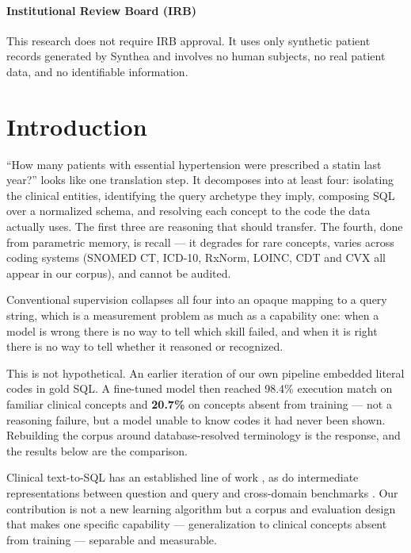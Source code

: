 \documentclass[pmlr,twocolumn,10pt]{jmlr} %
\begin{document}
\paragraph*{Institutional Review Board (IRB)}
This research does not require IRB approval. It uses only synthetic patient
records generated by Synthea and involves no human subjects, no real patient
data, and no identifiable information.
\fi

\section{Introduction}
\label{sec:intro}

``How many patients with essential hypertension were prescribed a statin last
year?'' looks like one translation step. It decomposes into at least four:
isolating the clinical entities, identifying the query archetype they imply,
composing SQL over a normalized schema, and resolving each concept to the code
the data actually uses. The first three are reasoning that should transfer. The
fourth, done from parametric memory, is recall --- it degrades for rare concepts,
varies across coding systems (SNOMED CT, ICD-10, RxNorm, LOINC, CDT and CVX all
appear in our corpus), and cannot be audited.

Conventional supervision collapses all four into an opaque mapping to a query
string, which is a measurement problem as much as a capability one: when a model
is wrong there is no way to tell which skill failed, and when it is right there
is no way to tell whether it reasoned or recognized.

This is not hypothetical. An earlier iteration of our own pipeline embedded
literal codes in gold SQL. A fine-tuned model then reached 98.4\% execution match
on familiar clinical concepts and \textbf{20.7\%} on concepts absent from
training --- not a reasoning failure, but a model unable to know codes it had
never been shown. Rebuilding the corpus around database-resolved terminology is
the response, and the results below are the comparison.

Clinical text-to-SQL has an established line of work
\citep{wang2020mimicsql,lee2022ehrsql,lee2024trustsql}, as do intermediate
representations between question and query
\citep{guo2019irnet,wang2020ratsql,pourreza2023dinsql} and cross-domain
benchmarks \citep{yu2018spider,li2023bird}. Our contribution is not a new
learning algorithm but a corpus and evaluation design that makes one specific
capability --- generalization to clinical concepts absent from training ---
separable and measurable.
\end{document}
